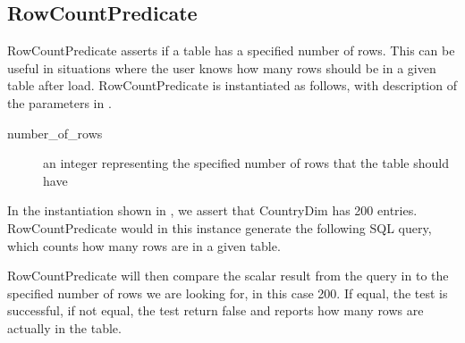 \subsection{RowCountPredicate}
RowCountPredicate asserts if a table has a specified number of rows. This can be useful in situations where the user knows how many rows should be in a given table after load. RowCountPredicate is instantiated as follows, with description of the parameters in .


\begin{description}
\item [number\_of\_rows] an integer representing the specified number of rows that the table should have 
\end{description}

In the instantiation shown in , we assert that CountryDim has 200 entries.  
RowCountPredicate would in this instance generate the following SQL query, which counts how many rows are in a given table.


RowCountPredicate will then compare the scalar result from the query in  to the specified number of rows we are looking for, in this case 200. If equal, the test is successful, if not equal, the test return false and reports how many rows are actually in the table.



